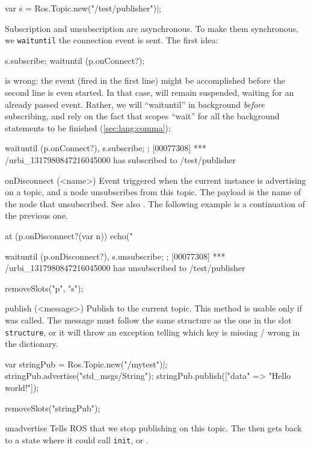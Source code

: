 \begin{urbiscriptapi}
\begin{urbiscript}
var s = Ros.Topic.new("/test/publisher")|;
\end{urbiscript}
  \noindent
  Subscription and unsubscription are asynchronous.  To make them
  synchronous, we \lstinline{waituntil} the connection event is sent.  The
  first idea:
\begin{urbiunchecked}
s.subscribe;
waituntil (p.onConnect?);
\end{urbiunchecked}
\noindent
is wrong: the event (fired in the first line) might be accomplished before
the second line is even started.  In that case, \urbi will remain suspended,
waiting for an already passed event.  Rather, we will ``waituntil'' in
background \emph{before} subscribing, and rely on the fact that scopes
``wait'' for all the background statements to be finished
(\autoref{sec:lang:comma}):
\begin{urbiscript}
{
  waituntil (p.onConnect?),
  s.subscribe;
};
[00077308] *** /urbi_1317980847216045000 has subscribed to /test/publisher
\end{urbiscript}


\item[onDisconnect](<name>)%
  Event triggered when the current instance is advertising on a topic, and a
  node unsubscribes from this topic. The payload  is the name of
  the node that unsubscribed.   See also .  The following
  example is a continuation of the previous one.
\begin{urbiscript}
at (p.onDisconnect?(var n))
  echo("%

{
  waituntil (p.onDisconnect?),
  s.unsubscribe;
};
[00077308] *** /urbi_1317980847216045000 has unsubscribed to /test/publisher
\end{urbiscript}
\begin{urbicomment}
removeSlots("p", "s");
\end{urbicomment}


\item[publish](<message>)%
  Publish  to the current topic. This method is usable only if
   was called. The message must follow the same structure
  as the one in the slot \lstinline{structure}, or it will throw an
  exception telling which key is missing / wrong in the dictionary.
\begin{urbiscript}
var stringPub = Ros.Topic.new("/mytest")|;
stringPub.advertise("std_msgs/String");
stringPub.publish(["data" => "Hello world!"]);
\end{urbiscript}
\begin{urbicomment}
removeSlots("stringPub");
\end{urbicomment}


\item[unadvertise]%
  Tells ROS that we stop publishing on this topic. The \UObject then gets back
  to a state where it could call \lstinline{init},  or
  .
\end{urbiscriptapi}


